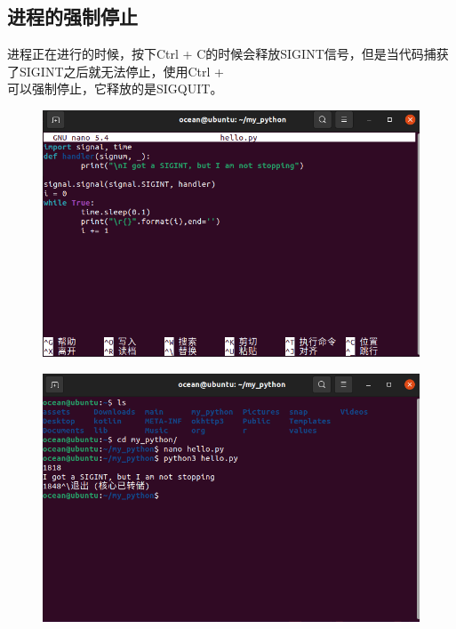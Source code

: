\documentclass{article}
\begin{document}
\subsection{进程的强制停止}
进程正在进行的时候，按下Ctrl + C的时候会释放SIGINT信号，但是当代码捕获了SIGINT之后就无法停止，使用Ctrl + \\可以强制停止，它释放的是SIGQUIT。
\begin{figure}[H]
    \centering
    \includegraphics[width=0.8\linewidth]{code_show.png}
\end{figure}
\begin{figure}[H]
    \centering
    \includegraphics[width=0.8\linewidth]{code_run.png}
\end{figure}
\end{document}
